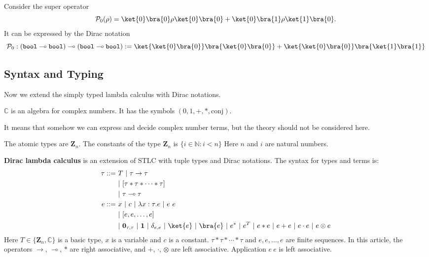 \begin{example}
  Consider the super operator 
  $$
  \mathcal{P}_0 (\rho) = \ket{0}\bra{0} \rho \ket{0}\bra{0} + \ket{0}\bra{1} \rho \ket{1}\bra{0}.
  $$
  It can be expressed by the Dirac notation
  $$
  \mathcal{P}_0 : (\texttt{bool} \multimap \texttt{bool}) \multimap (\texttt{bool} \multimap \texttt{bool}) := \ket{\ket{0}\bra{0}}\bra{\ket{0}\bra{0}} + \ket{\ket{0}\bra{0}}\bra{\ket{1}\bra{1}}
  $$
\end{example}


\subsection{Syntax and Typing}

Now we extend the simply typed lambda calculus with Dirac notations.

\begin{postulate}
  $\mathbb{C}$ is an algebra for complex numbers. It has the symbols $(0, 1, +, *, \textrm{conj})$.
\end{postulate}
It means that somehow we can express and decide complex number terms, but the theory should not be considered here.

\begin{definition}
  The atomic types are $\mathbf{Z}_n$.
  The constants of the type $\mathbf{Z}_n$ is $\{i \in \mathbb{N} : i<n\}$
  Here $n$ and $i$ are natural numbers.
\end{definition}


\begin{definition}
  \textbf{Dirac lambda calculus} is an extension of STLC with tuple types and Dirac notations. The syntax for types and terms is:
  \begin{align*}
    \tau ::=&\ T\ |\ \tau \to \tau\\
      &\ |\ [ \tau *\tau*\cdots * \tau ] \\
      &\ |\ \tau \multimap \tau\\
    e ::=&\ x\ |\ c\ |\ \lambda x : \tau. e\ |\ e\ e\\
      &\ |\ [e, e, \dots, e] \\
      &\ |\ \mathbf{0}_{\tau, \tau}\ |\ \mathbf{1}\ |\ \delta_{e, e}\ |\ \ket{e}\ |\ \bra{e}\ |\ e^*\ |\ e^T\ |\ e * e\ |\ e + e\ |\ e \cdot e\ |\ e \otimes e
  \end{align*}
  Here $T \in \{\mathbf{Z}_n, \mathbb{C}\}$ is a basic type, $x$ is a variable and $c$ is a constant. $\tau *\tau*\cdots * \tau$ and $e, e, \dots, e$ are finite sequences.
  In this article, the operators $\to$, $\multimap$, $*$ are right associative, and $+$, $\cdot$, $\otimes$ are left associative. Application $e\ e$ is left associative.
\end{definition}

